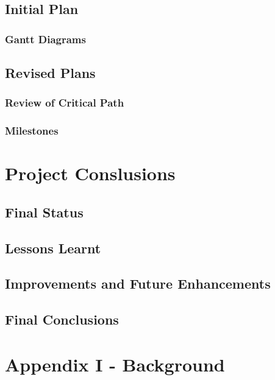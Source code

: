 \documentclass[a4paper,12pt]{article}
\begin{document}
\section{Initial Plan}

\subsection{Gantt Diagrams}

\section{Revised Plans}

\subsection{Review of Critical Path}

\subsection{Milestones}

\pagebreak


\chapter{Project Conslusions}

\section{Final Status}

\section{Lessons Learnt}

\section{Improvements and Future Enhancements}

\section{Final Conclusions}

\pagebreak


\chapter{Appendix I - Background}
\end{document}
